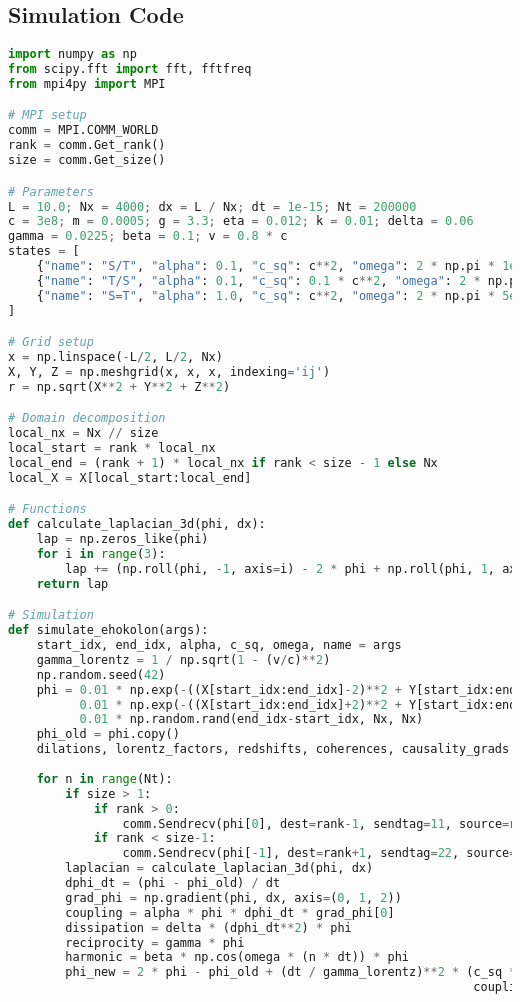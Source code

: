 \documentclass[11pt]{article}
\begin{document}
\subsection{Simulation Code}
\begin{lstlisting}[language=Python, caption={Fluxonic Spacetime Simulation}, label=lst:spacetime]
import numpy as np
from scipy.fft import fft, fftfreq
from mpi4py import MPI

# MPI setup
comm = MPI.COMM_WORLD
rank = comm.Get_rank()
size = comm.Get_size()

# Parameters
L = 10.0; Nx = 4000; dx = L / Nx; dt = 1e-15; Nt = 200000
c = 3e8; m = 0.0005; g = 3.3; eta = 0.012; k = 0.01; delta = 0.06
gamma = 0.0225; beta = 0.1; v = 0.8 * c
states = [
    {"name": "S/T", "alpha": 0.1, "c_sq": c**2, "omega": 2 * np.pi * 1e-4},
    {"name": "T/S", "alpha": 0.1, "c_sq": 0.1 * c**2, "omega": 2 * np.pi * 1e17},
    {"name": "S=T", "alpha": 1.0, "c_sq": c**2, "omega": 2 * np.pi * 5e14}
]

# Grid setup
x = np.linspace(-L/2, L/2, Nx)
X, Y, Z = np.meshgrid(x, x, x, indexing='ij')
r = np.sqrt(X**2 + Y**2 + Z**2)

# Domain decomposition
local_nx = Nx // size
local_start = rank * local_nx
local_end = (rank + 1) * local_nx if rank < size - 1 else Nx
local_X = X[local_start:local_end]

# Functions
def calculate_laplacian_3d(phi, dx):
    lap = np.zeros_like(phi)
    for i in range(3):
        lap += (np.roll(phi, -1, axis=i) - 2 * phi + np.roll(phi, 1, axis=i)) / dx**2
    return lap

# Simulation
def simulate_ehokolon(args):
    start_idx, end_idx, alpha, c_sq, omega, name = args
    gamma_lorentz = 1 / np.sqrt(1 - (v/c)**2)
    np.random.seed(42)
    phi = 0.01 * np.exp(-((X[start_idx:end_idx]-2)**2 + Y[start_idx:end_idx]**2 + Z[start_idx:end_idx]**2)/0.1**2) * np.cos(5*X[start_idx:end_idx]) + \
          0.01 * np.exp(-((X[start_idx:end_idx]+2)**2 + Y[start_idx:end_idx]**2 + Z[start_idx:end_idx]**2)/0.1**2) * np.cos(5*X[start_idx:end_idx]) + \
          0.01 * np.random.rand(end_idx-start_idx, Nx, Nx)
    phi_old = phi.copy()
    dilations, lorentz_factors, redshifts, coherences, causality_grads = [], [], [], [], []
    
    for n in range(Nt):
        if size > 1:
            if rank > 0:
                comm.Sendrecv(phi[0], dest=rank-1, sendtag=11, source=rank-1, recvtag=22)
            if rank < size-1:
                comm.Sendrecv(phi[-1], dest=rank+1, sendtag=22, source=rank+1, recvtag=11)
        laplacian = calculate_laplacian_3d(phi, dx)
        dphi_dt = (phi - phi_old) / dt
        grad_phi = np.gradient(phi, dx, axis=(0, 1, 2))
        coupling = alpha * phi * dphi_dt * grad_phi[0]
        dissipation = delta * (dphi_dt**2) * phi
        reciprocity = gamma * phi
        harmonic = beta * np.cos(omega * (n * dt)) * phi
        phi_new = 2 * phi - phi_old + (dt / gamma_lorentz)**2 * (c_sq * laplacian - m**2 * phi - g * phi**3 - eta * phi**5 + 
                                                                 coupling - dissipation + reciprocity - harmonic + 8 * np.pi * G * k * phi**2)
        

\end{lstlisting}
\end{document}
